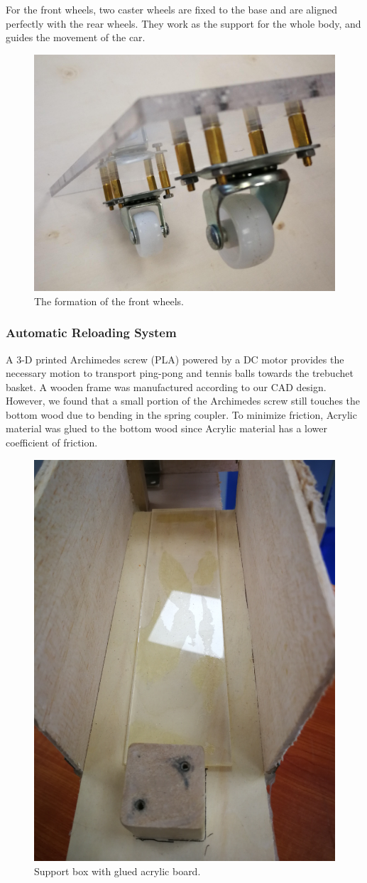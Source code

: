 \documentclass{article}
\begin{document}
For the front wheels, two caster wheels are fixed to the base and are aligned perfectly with the rear wheels. They work as the support for the whole body, and guides the movement of the car.
\begin{figure}[H]
\centering
\includegraphics[width=0.5\linewidth]{wheel2}
\caption{The formation of the front wheels.}
\end{figure}



\subsubsection*{Automatic Reloading System}
A 3-D printed Archimedes screw (PLA) powered by a DC motor provides the necessary motion to transport ping-pong and tennis balls towards the trebuchet basket. A wooden frame was manufactured according to our CAD design. However, we found that a small portion of the Archimedes screw still touches the bottom wood due to bending in the spring coupler. To minimize friction, Acrylic material was glued to the bottom wood since Acrylic material has a lower coefficient of friction.
\begin{figure}[H]
\centering
\includegraphics[width=0.4\linewidth]{stick}
\caption{Support box with glued acrylic board.}
\end{figure}
\end{document}
